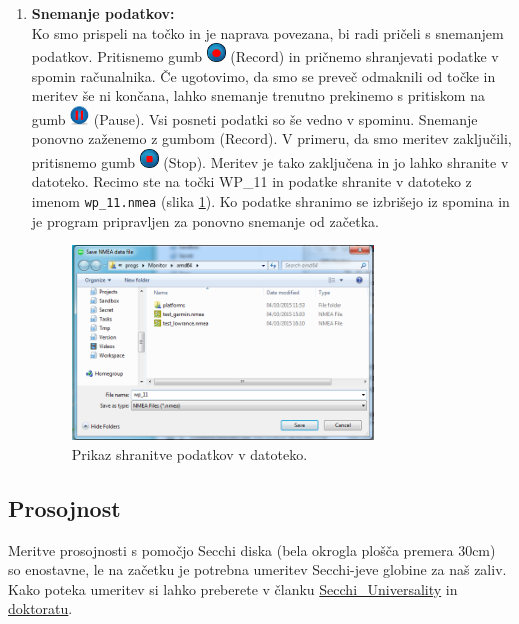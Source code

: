 \documentclass[11pt]{article}
\begin{document}
\begin{enumerate}
	\item \textbf{Snemanje podatkov:}\\[1mm]
	Ko smo prispeli na točko in je naprava povezana, bi radi pričeli s snemanjem podatkov. Pritisnemo gumb \includegraphics[width=5mm]{figs/icons/record.png} (Record) in pričnemo shranjevati podatke v spomin računalnika. Če ugotovimo, da smo se preveč odmaknili od točke in meritev še ni končana, lahko snemanje trenutno prekinemo s pritiskom na gumb \includegraphics[width=5mm]{figs/icons/pause.png} (Pause). Vsi posneti podatki so še vedno v spominu. Snemanje ponovno zaženemo z gumbom (Record). V primeru, da smo meritev zaključili, pritisnemo gumb \includegraphics[width=5mm]{figs/icons/stop.png} (Stop). Meritev je tako zaključena in jo lahko shranite v datoteko. Recimo ste na točki WP\_11 in podatke shranite v datoteko z imenom \texttt{wp\_11.nmea} (slika \ref{fig:v_est_lmp_03}). Ko podatke shranimo se izbrišejo iz spomina in je program pripravljen za ponovno snemanje od začetka.\\[2mm]
	
	\begin{figure}[!h]
		\centering \includegraphics[width=8cm]{figs/save.png}
		\caption{Prikaz shranitve podatkov v datoteko.}
		\label{fig:v_est_lmp_03}
	\end{figure}
	
\end{enumerate}


\subsection{Prosojnost}
Meritve prosojnosti s pomočjo Secchi diska (bela okrogla plošča premera 30cm) so enostavne, le na začetku je potrebna umeritev Secchi-jeve globine za naš zaliv. Kako poteka umeritev si lahko preberete v članku \href{https://drive.google.com/open?id=0B1dT-CBA07ANSFBneFpLSXV1SjQ}{Secchi\_Universality} in \href{https://drive.google.com/open?id=0B1dT-CBA07ANbmRIQkZieUhGYVE}{doktoratu}.\\[5mm]
\end{document}
